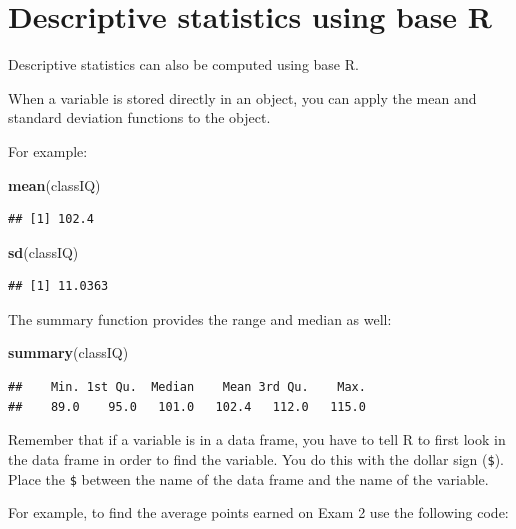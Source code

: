 \documentclass[
]{book}
\newenvironment{Shaded}{\begin{snugshade}}{\end{snugshade}}
\newcommand{\KeywordTok}[1]{\textcolor[rgb]{0.13,0.29,0.53}{\textbf{#1}}}
\newcommand{\NormalTok}[1]{#1}
\begin{document}
\hypertarget{descriptive-statistics-using-base-r}{%
\section{Descriptive statistics using base R}\label{descriptive-statistics-using-base-r}}

Descriptive statistics can also be computed using base R.

When a variable is stored directly in an object, you can apply the mean and standard deviation functions to the object.

For example:

\begin{Shaded}
\begin{Highlighting}[]
\KeywordTok{mean}\NormalTok{(classIQ)}
\end{Highlighting}
\end{Shaded}

\begin{verbatim}
## [1] 102.4
\end{verbatim}

\begin{Shaded}
\begin{Highlighting}[]
\KeywordTok{sd}\NormalTok{(classIQ)}
\end{Highlighting}
\end{Shaded}

\begin{verbatim}
## [1] 11.0363
\end{verbatim}

The summary function provides the range and median as well:

\begin{Shaded}
\begin{Highlighting}[]
\KeywordTok{summary}\NormalTok{(classIQ)}
\end{Highlighting}
\end{Shaded}

\begin{verbatim}
##    Min. 1st Qu.  Median    Mean 3rd Qu.    Max. 
##    89.0    95.0   101.0   102.4   112.0   115.0
\end{verbatim}

Remember that if a variable is in a data frame, you have to tell R to first look in the data frame in order to find the variable. You do this with the dollar sign (\texttt{\$}). Place the \texttt{\$} between the name of the data frame and the name of the variable.

For example, to find the average points earned on Exam 2 use the following code:
\end{document}
